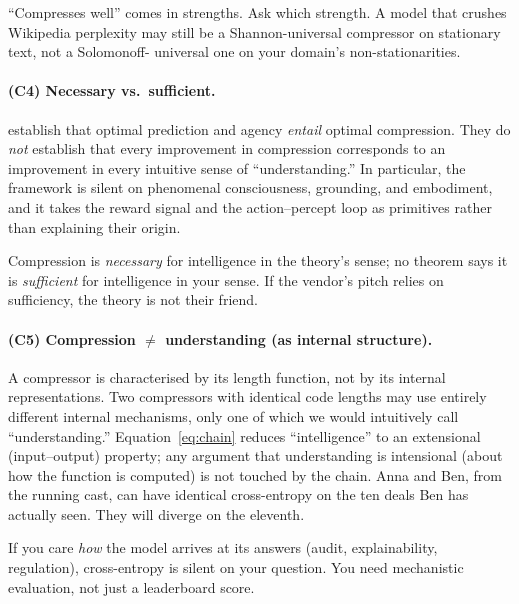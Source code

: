\begin{procurement}
``Compresses well'' comes in strengths. Ask which strength. A
model that crushes Wikipedia perplexity may still be a
Shannon-universal compressor on stationary text, not a Solomonoff-
universal one on your domain's non-stationarities.
\end{procurement}

\paragraph{(C4) Necessary vs.\ sufficient.}
 establish that optimal prediction
and agency \emph{entail} optimal compression. They do \emph{not}
establish that every improvement in compression corresponds to an
improvement in every intuitive sense of ``understanding.'' In
particular, the framework is silent on phenomenal consciousness,
grounding, and embodiment, and it takes the reward signal and the
action--percept loop as primitives rather than explaining their
origin.

\begin{procurement}
Compression is \emph{necessary} for intelligence in the theory's
sense; no theorem says it is \emph{sufficient} for intelligence in
your sense. If the vendor's pitch relies on sufficiency, the
theory is not their friend.
\end{procurement}

\paragraph{(C5) Compression $\ne$ understanding (as internal structure).}
A compressor is characterised by its length function, not by its
internal representations. Two compressors with identical code
lengths may use entirely different internal mechanisms, only one of
which we would intuitively call ``understanding.''
Equation~\eqref{eq:chain} reduces ``intelligence'' to an extensional
(input--output) property; any argument that understanding is
intensional (about how the function is computed) is not touched by
the chain. Anna and Ben, from the running cast, can have identical
cross-entropy on the ten deals Ben has actually seen. They will
diverge on the eleventh.

\begin{procurement}
If you care \emph{how} the model arrives at its answers (audit,
explainability, regulation), cross-entropy is silent on your
question. You need mechanistic evaluation, not just a leaderboard
score.
\end{procurement}

